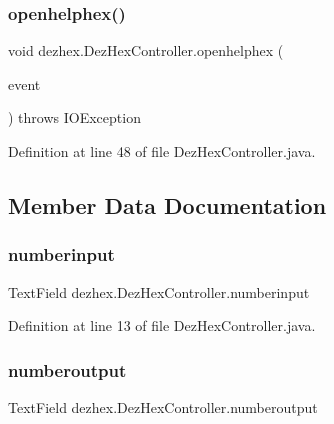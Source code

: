 \subsubsection{\texorpdfstring{openhelphex()}{openhelphex()}}
{\footnotesize\ttfamily void dezhex.\+Dez\+Hex\+Controller.\+openhelphex (\begin{DoxyParamCaption}\item[{Action\+Event}]{event }\end{DoxyParamCaption}) throws I\+O\+Exception\hspace{0.3cm}{\ttfamily [protected]}}



Definition at line 48 of file Dez\+Hex\+Controller.\+java.



\subsection{Member Data Documentation}
\mbox{\label{classdezhex_1_1_dez_hex_controller_a12c00215edb2e800ada95de241beaffc}} 
\subsubsection{\texorpdfstring{numberinput}{numberinput}}
{\footnotesize\ttfamily Text\+Field dezhex.\+Dez\+Hex\+Controller.\+numberinput\hspace{0.3cm}{\ttfamily [private]}}



Definition at line 13 of file Dez\+Hex\+Controller.\+java.

\mbox{\label{classdezhex_1_1_dez_hex_controller_aec495133208c435c31fb55d0485b4817}} 
\subsubsection{\texorpdfstring{numberoutput}{numberoutput}}
{\footnotesize\ttfamily Text\+Field dezhex.\+Dez\+Hex\+Controller.\+numberoutput\hspace{0.3cm}{\ttfamily [private]}}



